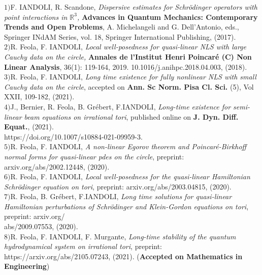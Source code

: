 \documentclass[margin,line,pifont,palatino,courier]{res}
\begin{document}
\begin{resume}
$1)${\rm{F. IANDOLI, R. Scandone}},  \textit{Dispersive estimates for Schr\"odinger operators with point interactions in $\mathbb{R}^3$,}  {\textbf {Advances in Quantum Mechanics: Contemporary Trends and Open Problems}}, A. Michelangeli and G. Dell'Antonio, eds., Springer INdAM Series, vol. 18, Springer International Publishing, (2017).\vspace{0.1cm}\\
$2)${\rm{R. Feola, F. IANDOLI}},  \textit{Local well-posedness for quasi-linear NLS with large Cauchy data on the circle,}  \textbf{Annales de l'Institut Henri Poincar\'e (C) Non Linear Analysis}, 36(1): 119-164, 2019. 10.1016/j.anihpc.2018.04.003, (2018).\vspace{0.1cm}\\
$3)${\rm{R. Feola, F. IANDOLI}}, \textit{Long time existence for fully nonlinear NLS with small Cauchy data on the circle}, accepted on  \textbf{Ann. Sc Norm.  Pisa Cl. Sci.} (5), Vol XXII, 109-182, (2021).\vspace{0.1cm}\\
$4)${\rm{J., Bernier, R. Feola, B. Gr\'ebert, F.IANDOLI}}, \textit{Long-time existence for semi-linear beam equations on irrational tori}, published online on \textbf{J. Dyn. Diff. Equat.}, (2021). \\ https://doi.org/10.1007/s10884-021-09959-3.\vspace{0.1cm}\\
$5)${\rm{R. Feola, F. IANDOLI}}, \textit{A non-linear Egorov theorem and Poincar\'e-Birkhoff normal forms for quasi-linear pdes on the circle}, preprint: arxiv.org/abs/2002.12448, (2020).\vspace{0.1cm}\\
$6)${\rm{R. Feola, F. IANDOLI}}, \textit{Local well-posedness for the quasi-linear Hamiltonian Schr\"odinger equation on tori}, preprint: arxiv.org/abs/2003.04815, (2020).\vspace{0.1cm}\\
$7)${\rm{R. Feola, B. Gr\'ebert, F.IANDOLI}}, \textit{Long time solutions for quasi-linear Hamiltonian perturbations of Schr\"odinger and Klein-Gordon equations on tori}, preprint: arxiv.org/\\abs/2009.07553, (2020). \vspace{0.1cm}\\
$8)${\rm{R. Feola, F. IANDOLI, F. Murgante}}, \textit{Long-time stability of the quantum hydrodynamical system on irrational tori}, preprint: https://arxiv.org/abs/2105.07243, (2021). (\textbf{Accepted on Mathematics in Engineering})\vspace{0.1cm}\\




\end{resume}
\end{document}
